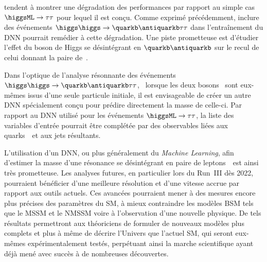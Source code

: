 tendent à montrer une dégradation des performances par rapport au simple cas $\higgsML\to\tau\tau$
pour lequel il est conçu.
Comme exprimé précédemment,
inclure des événements $\higgs\higgs\to\quarkb\antiquarkb\tau\tau$
dans l'entraînement du DNN pourrait remédier à cette dégradation.
Une piste prometteuse est d'étudier l'effet du boson de Higgs se désintégrant en $\quarkb\antiquarkb$ sur le recul de celui donnant la paire de~\tau.
\par
Dans l'optique de l'analyse \og résonnante \fg{} des événements
$\higgs\higgs\to\quarkb\antiquarkb\tau\tau$,
\ie\ lorsque les deux bosons \higgs\ sont eux-mêmes issus d'une seule particule initiale,
il est envisageable de créer un autre DNN
spécialement conçu pour prédire directement la masse de celle-ci.
Par rapport au DNN utilisé pour les événements $\higgsML\to\tau\tau$,
la liste des variables d'entrée pourrait être complétée
par des observables liées aux quarks~\quarkb\ et aux jets résultants.
\par
L'utilisation d'un DNN, ou plus généralement du \emph{Machine Learning}, afin d'estimer la masse d'une résonance se désintégrant en paire de leptons~\tau\
est ainsi très prometteuse.
Les analyses futures, en particulier lors du Run~III dès 2022,
pourraient bénéficier d'une meilleure résolution et d'une vitesse accrue par rapport aux outils actuels.
Ces avancées pourraient mener
à des mesures encore plus précises des paramètres du SM,
à mieux contraindre les modèles BSM tels que le MSSM et le NMSSM
voire
à l'observation d'une nouvelle physique.
De tels résultats permettront aux théoriciens de formuler de nouveaux modèles
plus complets
et plus à même de décrire l'Univers
que l'actuel SM,
qui seront eux-mêmes expérimentalement testés,
perpétuant ainsi la marche scientifique
ayant déjà mené avec succès à de nombreuses découvertes.